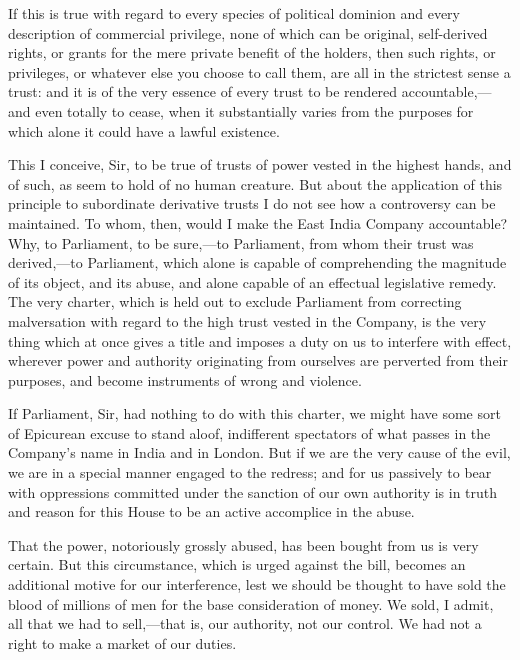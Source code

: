 If this is true with regard to every species of political dominion and every description of commercial privilege, none of which can be original, self-derived rights, or grants for the mere private benefit of the holders, then such rights, or privileges, or whatever else you choose to call them, are all in the strictest sense a trust: and it is of the very essence of every trust to be rendered accountable,—and even totally to cease, when it substantially varies from the purposes for which alone it could have a lawful existence.

This I conceive, Sir, to be true of trusts of power vested in the highest hands, and of such, as seem to hold of no human creature. But about the application of this principle to subordinate derivative trusts I do not see how a controversy can be maintained. To whom, then, would I make the East India Company accountable? Why, to Parliament, to be sure,—to Parliament, from whom their trust was derived,—to Parliament, which alone is capable of comprehending the magnitude of its object, and its abuse, and alone capable of an effectual legislative remedy. The very charter, which is held out to exclude Parliament from correcting malversation with regard to the high trust vested in the Company, is the very thing which at once gives a title and imposes a duty on us to interfere with effect, wherever power and authority originating from ourselves are perverted from their purposes, and become instruments of wrong and violence.

If Parliament, Sir, had nothing to do with this charter, we might have some sort of Epicurean excuse to stand aloof, indifferent spectators of what passes in the Company's name in India and in London. But if we are the very cause of the evil, we are in a special manner engaged to the redress; and for us passively to bear with oppressions committed under the sanction of our own authority is in truth and reason for this House to be an active accomplice in the abuse.

That the power, notoriously grossly abused, has been bought from us is very certain. But this circumstance, which is urged against the bill, becomes an additional motive for our interference, lest we should be thought to have sold the blood of millions of men for the base consideration of money. We sold, I admit, all that we had to sell,—that is, our authority, not our control. We had not a right to make a market of our duties.

